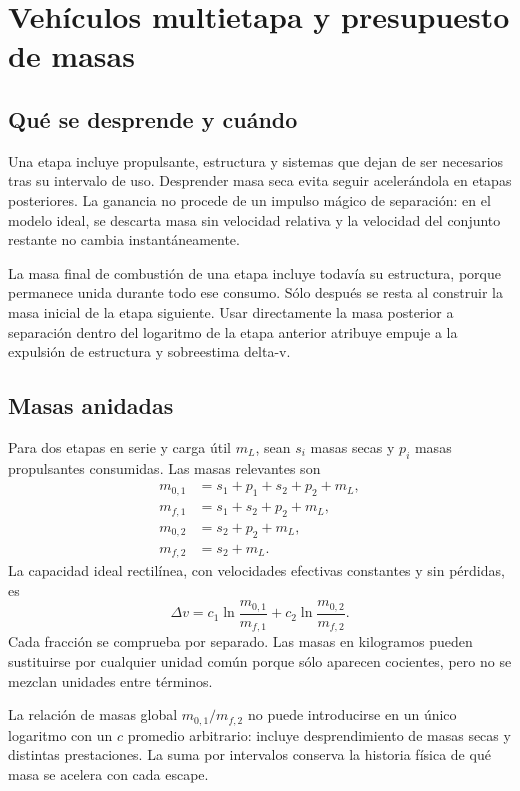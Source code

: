 \chapter{Vehículos multietapa y presupuesto de masas}\label{ch:26}
\section{Qué se desprende y cuándo}
Una etapa incluye propulsante, estructura y sistemas que dejan de ser necesarios tras su intervalo de uso. Desprender masa seca evita seguir acelerándola en etapas posteriores. La ganancia no procede de un impulso mágico de separación: en el modelo ideal, se descarta masa sin velocidad relativa y la velocidad del conjunto restante no cambia instantáneamente.

La masa final de combustión de una etapa incluye todavía su estructura, porque permanece unida durante todo ese consumo. Sólo después se resta al construir la masa inicial de la etapa siguiente. Usar directamente la masa posterior a separación dentro del logaritmo de la etapa anterior atribuye empuje a la expulsión de estructura y sobreestima delta-v.
\section{Masas anidadas}
Para dos etapas en serie y carga útil $m_L$, sean $s_i$ masas secas y $p_i$ masas propulsantes consumidas. Las masas relevantes son
\begin{align}
 m_{0,1}&=s_1+p_1+s_2+p_2+m_L,\\
 m_{f,1}&=s_1+s_2+p_2+m_L,\\
 m_{0,2}&=s_2+p_2+m_L,\\
 m_{f,2}&=s_2+m_L.
\end{align}
La capacidad ideal rectilínea, con velocidades efectivas constantes y sin pérdidas, es
\begin{equation}\label{eq:stages}
 \Delta v= c_1\ln\frac{m_{0,1}}{m_{f,1}}
 +c_2\ln\frac{m_{0,2}}{m_{f,2}}.
\end{equation}
Cada fracción se comprueba por separado. Las masas en kilogramos pueden sustituirse por cualquier unidad común porque sólo aparecen cocientes, pero no se mezclan unidades entre términos.\cite{MIT32}

La relación de masas global $m_{0,1}/m_{f,2}$ no puede introducirse en un único logaritmo con un $c$ promedio arbitrario: incluye desprendimiento de masas secas y distintas prestaciones. La suma por intervalos conserva la historia física de qué masa se acelera con cada escape.
